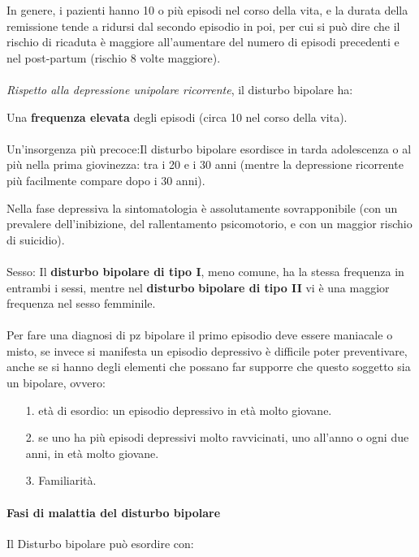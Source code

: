 In genere, i pazienti hanno 10 o più episodi nel corso della vita, e la
durata della remissione tende a ridursi dal secondo episodio in poi, per
cui si può dire che il rischio di ricaduta è maggiore all'aumentare del
numero di episodi precedenti e nel post-partum (rischio 8 volte
maggiore).
\\\\
\emph{Rispetto alla depressione unipolare ricorrente}, il disturbo
bipolare ha:

Una \textbf{frequenza elevata} degli episodi (circa 10 nel corso della
vita).
\\\\
Un'insorgenza più precoce:Il disturbo bipolare esordisce in tarda
adolescenza o al più nella prima giovinezza: tra i 20 e i 30 anni
(mentre la depressione ricorrente più facilmente compare dopo i 30
anni).

Nella fase depressiva la sintomatologia è assolutamente sovrapponibile
(con un prevalere dell'inibizione, del rallentamento psicomotorio, e con
un maggior rischio di suicidio).
\\\\
Sesso: Il \textbf{disturbo bipolare di tipo I}, meno comune, ha la
stessa frequenza in entrambi i sessi, mentre nel \textbf{disturbo}
\textbf{bipolare di tipo II} vi è una maggior frequenza nel sesso
femminile.
\\\\
Per fare una diagnosi di pz bipolare il primo episodio deve essere
maniacale o misto, se invece si manifesta un episodio depressivo è
difficile poter preventivare, anche se si hanno degli elementi che
possano far supporre che questo soggetto sia un bipolare, ovvero:

\begin{itemize}
\item[1.]
  età di esordio: un episodio depressivo in età molto giovane.
\item[2.]
  se uno ha più episodi depressivi molto ravvicinati, uno all'anno o
  ogni due anni, in età molto giovane.
\item[3.]
  Familiarità.
\end{itemize}

\paragraph{Fasi di malattia del disturbo bipolare}

Il Disturbo bipolare può esordire con:

